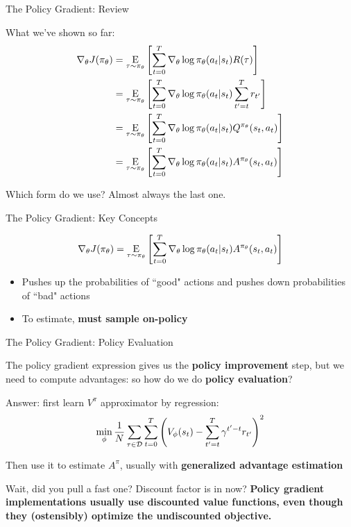 \documentclass[9pt]{beamer}
\newcommand{\underE}[2]{\underset{\begin{subarray}{c}#1 \end{subarray}}{\E}\left[ #2 \right]}
\begin{document}
\begin{frame}{The Policy Gradient: Review}

What we've shown so far:
%
\begin{align*}
\nabla_{\theta} J(\pi_{\theta}) &=\underE{\tau \sim \pi_{\theta}}{\sum_{t=0}^T \nabla_{\theta} \log \pi_{\theta}(a_t | s_t) R(\tau)}\\ 
&=\underE{\tau \sim \pi_{\theta}}{\sum_{t=0}^T \nabla_{\theta} \log \pi_{\theta}(a_t | s_t) \sum_{t'=t}^T r_{t'}}\\
&=\underE{\tau \sim \pi_{\theta}}{\sum_{t=0}^T \nabla_{\theta} \log \pi_{\theta}(a_t | s_t) Q^{\pi_{\theta}}(s_t, a_t)}\\
 &=\underE{\tau \sim \pi_{\theta}}{\sum_{t=0}^T \nabla_{\theta} \log \pi_{\theta}(a_t | s_t) A^{\pi_{\theta}}(s_t, a_t)}
\end{align*}

Which form do we use? Almost always the last one.

\end{frame}

\begin{frame}{The Policy Gradient: Key Concepts}

\begin{equation*}
\nabla_{\theta} J(\pi_{\theta}) = \underE{\tau \sim \pi_{\theta}}{\sum_{t=0}^T \nabla_{\theta} \log \pi_{\theta}(a_t | s_t) A^{\pi_{\theta}}(s_t, a_t)}
\end{equation*}

\begin{itemize}
\item Pushes up the probabilities of ``good" actions and pushes down probabilities of ``bad" actions
\item To estimate, \textbf{must sample on-policy}
\end{itemize}
\end{frame}

\begin{frame}{The Policy Gradient: Policy Evaluation}

The policy gradient expression gives us the \textbf{policy improvement} step, but we need to compute advantages: so how do we do \textbf{policy evaluation}?

\vspace{1em}

Answer: first learn $V^{\pi}$ approximator by regression:
%
\begin{equation*}
\min_{\phi} \frac{1}{N}\sum_{\tau \in {\mathcal D}} \sum_{t=0}^T \left(V_{\phi}(s_t) - \sum_{t'=t}^T \gamma^{t'-t} r_{t'}\right)^2
\end{equation*}

Then use it to estimate $A^{\pi}$, usually with \textbf{generalized advantage estimation}

\pause
\vspace{2em}

Wait, did you pull a fast one? Discount factor is in now? \textbf{Policy gradient implementations usually use discounted value functions, even though they (ostensibly) optimize the undiscounted objective.}
\end{frame}
\end{document}
